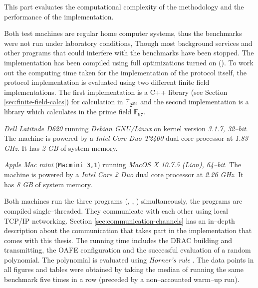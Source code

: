 \label{sec:evaluation}

This part evaluates the computational complexity of the methodology and the
performance of the implementation.


%
%
\label{sec:test-setup}

\label{sec:test-machines}

Both test machines are regular home computer systems, thus the benchmarks were
not run under laboratory conditions, Though most background services and other
programs that could interfere with the benchmarks have been stopped. The
implementation has been compiled using full optimizations turned on
(). To work out the computing time
taken for the implementation of the protocol itself, the protocol implementation
is evaluated using two different finite field implementations.
The first implementation is a C++ library (see Section
\ref{sec:finite-field-calcs}) for calculation in $\mathbb{F}_{2^{256}}$ and the
second implementation is a \JWThaskell{} library which calculates in the prime
field $\mathbb{F}_{97}$.



\emph{Dell Latitude D620} running \emph{Debian GNU/Linux} on kernel version
\emph{3.1.7, 32--bit}. The machine is powered by a \emph{Intel\TReg{} Core Duo
T2400} dual core processor at \emph{1.83 GHz}. It has \emph{2 GB} of system
memory.



\emph{Apple Mac mini} (\texttt{Macmini 3,1}) running \emph{MacOS X 10.7.5
(Lion), 64--bit}. The machine is powered by a \emph{Intel\TReg{} Core 2 Duo}
dual core processor at \emph{2.26 GHz}. It has \emph{8 GB} of system memory.


Both machines run the three programs (\JWBpOne{}, \JWBpTwo{}, \JWBtoken{})
simultaneously, the programs are compiled single--threaded. They
communicate with each other using local TCP/IP networking. Section
\ref{sec:communication-channels} has an in--depth description about the
communication that takes part in the implementation that comes with this thesis.
The running time includes the DRAC building and transmitting, the OAFE
configuration and the successful evaluation of a random polynomial. The
polynomial is evaluated using \emph{Horner's rule} \cite{cormen01}. The data
points in all figures and tables were obtained by taking the median of
running the same benchmark five times in a row (preceded by a non--accounted
warm--up run).



